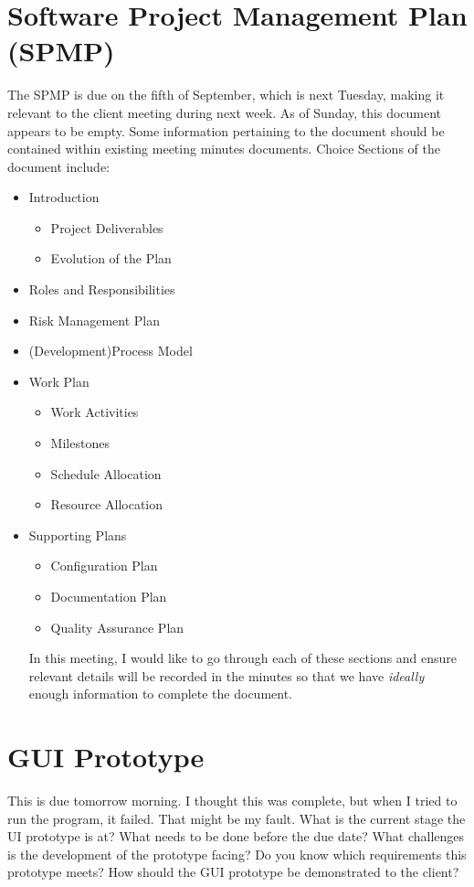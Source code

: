 \documentclass[11pt, a4paper]{article}
\begin{document}
\begin{flushleft}
  \section{Software Project Management Plan (SPMP)}
		{The SPMP is due on the fifth of September, which is next Tuesday, making it relevant to the client meeting during next week. As of Sunday, this document appears to be empty. Some information pertaining to the document should be contained within existing meeting minutes documents. Choice Sections of the document include:
		\begin{itemize}
		\item Introduction
		\begin{itemize}
		\item Project Deliverables
		\item Evolution of the Plan
		\end{itemize}
		\item Roles and Responsibilities
		\item Risk Management Plan
		\item (Development)Process Model
		\item Work Plan
		\begin{itemize}
		\item Work Activities
		\item Milestones
		\item Schedule Allocation
		\item Resource Allocation
		\end{itemize}
		\item Supporting Plans
		\begin{itemize}
		\item Configuration Plan
		\item Documentation Plan
		\item Quality Assurance Plan
		\end{itemize}
		
		In this meeting, I would like to go through each of these sections and ensure relevant details will be recorded in the minutes so that we have \textit{ideally} enough information to complete the document.
\end{itemize}		 }

  \section{GUI Prototype}
  This is due tomorrow morning. I thought this was complete, but when I tried to run the program, it failed. That might be my fault. What is the current stage the UI prototype is at? What needs to be done before the due date? What challenges is the development of the prototype facing? Do you know which requirements this prototype meets? How should the GUI prototype be demonstrated to the client?
  

\end{flushleft}
\end{document}
